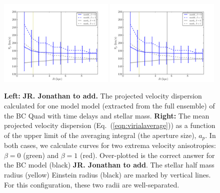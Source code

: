 \documentclass[galley,usenatbib]{mn2e}
\newcommand{\eqnref}[1] {Eq.~(\ref{#1})}
\begin{document}
\begin{figure}
\includegraphics[width=0.49\textwidth]{BCQuadR1a_TmS_sigpbar.pdf}
\includegraphics[width=0.49\textwidth]{BCQuadR1a_TmS_sigpbar.pdf}
\caption{{\bf Left:} {\bf JR. Jonathan to add.} The projected velocity dispersion calculated for one model model (extracted from the full ensemble) of the BC Quad with time delays and stellar mass. {\bf Right:} The mean projected velocity dispersion (\eqnref{eqn:virialaverage}) as a function of the upper limit of the averaging integral (the aperture size), $a_p$. In both cases, we calculate curves for two extrema velocity anisotropies: $\beta=0$ (green) and $\beta=1$ (red). Over-plotted is the correct answer for the BC model (black) {\bf JR. Jonathan to add}. The stellar half mass radius (yellow) Einstein radius (black) are marked by vertical lines. For this configuration, these two radii are well-separated.}
\label{sigma-beta}
\end{figure}

%
\end{document}
